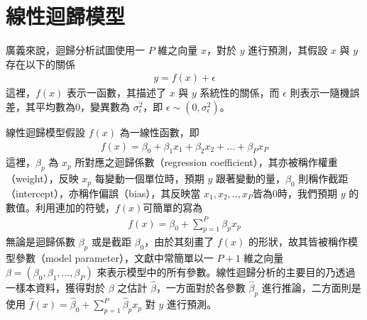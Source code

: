 \documentclass[letterpaper,10pt,english]{sphinxmanual}
\begin{document}
\section{線性迴歸模型}
\label{\detokenize{notebook/linear-regression:id2}}
廣義來說，迴歸分析試圖使用一 \(P\) 維之向量 \(x\)，對於 \(y\) 進行預測，其假設 \(x\) 與 \(y\) 存在以下的關係
\begin{equation*}
\begin{split}y=f(x)+\epsilon\end{split}
\end{equation*}
這裡，\(f(x)\) 表示一函數，其描述了 \(x\) 與 \(y\) 系統性的關係，而 \(\epsilon\) 則表示一隨機誤差，其平均數為0，變異數為 \(\sigma_{\epsilon}^2\)，即 \(\epsilon \sim (0,\sigma_{\epsilon}^2)\)。

線性迴歸模型假設 \(f(x)\) 為一線性函數，即
\begin{equation*}
\begin{split}f(x) =\beta_0 + \beta_1 x_1 + \beta_2 x_2 + ... + \beta_P x_P\end{split}
\end{equation*}
這裡，\(\beta_p\) 為 \(x_p\) 所對應之迴歸係數（regression coefficient），其亦被稱作權重（weight），反映 \(x_p\) 每變動一個單位時，預期 \(y\) 跟著變動的量，\(\beta_0\) 則稱作截距（intercept），亦稱作偏誤（bias），其反映當 \(x_1,x_2,..,x_P\)皆為0時，我們預期 \(y\) 的數值。利用連加的符號，\(f(x)\)可簡單的寫為
\begin{equation*}
\begin{split}f(x) = \beta_0 + \sum_{p=1}^P \beta_p x_p\end{split}
\end{equation*}
無論是迴歸係數 \(\beta_p\) 或是截距 \(\beta_0\)，由於其刻畫了 \(f(x)\) 的形狀，故其皆被稱作模型參數（model parameter），文獻中常簡單以一 \(P+1\) 維之向量 \(\beta = (\beta_0, \beta_1, ..., \beta_P)\) 來表示模型中的所有參數。線性迴歸分析的主要目的乃透過一樣本資料，獲得對於 \(\beta\) 之估計 \(\widehat{\beta}\)，一方面對於各參數 \(\widehat{\beta}_p\) 進行推論，二方面則是使用 \(\widehat{f}(x) = \widehat{\beta}_0 + \sum_{p=1}^P \widehat{\beta}_p x_p\) 對 \(y\) 進行預測。
\end{document}
